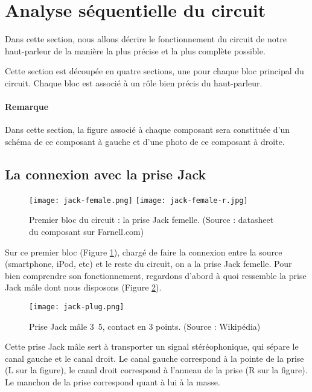

\section{Analyse séquentielle du circuit}
Dans cette section, nous allons décrire le fonctionnement du circuit
de notre haut-parleur de la manière la plus précise et la plus complète
possible. 

Cette section est découpée en quatre sections, une pour chaque bloc 
principal du circuit. Chaque bloc est associé à un rôle bien précis du
haut-parleur.

\paragraph{Remarque}
Dans cette section, la figure associé à chaque composant sera constituée
d'un schéma de ce composant à gauche et d'une photo de ce composant à droite.

\subsection{La connexion avec la prise Jack}

\begin{figure}[!hbt]
	\centering
	\texttt{[image: jack-female.png]}
	\texttt{[image: jack-female-r.jpg]}
	\caption{Premier bloc du circuit :
					la prise Jack femelle. (Source : datasheet du composant sur Farnell.com)}
	\label{jack-female}
\end{figure}

Sur ce premier bloc (Figure \ref{jack-female}), chargé de faire la connexion 
entre la source (smartphone, iPod, etc) et le reste du circuit, on a la prise Jack femelle. 
Pour bien comprendre son fonctionnement, regardons d'abord à quoi ressemble la prise Jack
mâle dont nous disposons (Figure \ref{jack-plug}).

\begin{figure}[!hbt]
	\centering
	\texttt{[image: jack-plug.png]}
	\caption{Prise Jack mâle \unit{3.5}{\milli\meter}, contact en 3 points. (Source : Wikipédia)}
	\label{jack-plug}
\end{figure}

Cette prise Jack mâle sert à transporter un signal stéréophonique, qui sépare le 
canal gauche et le canal droit. Le canal gauche correspond à la pointe de la prise 
(L sur la figure), le canal droit correspond à l'anneau de la prise (R sur la figure). 
Le manchon de la prise correspond quant à lui à la masse.

